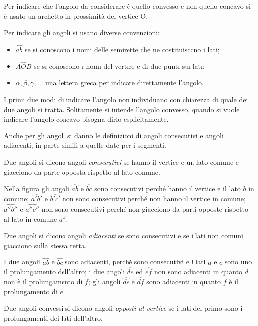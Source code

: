 {Per indicare che l'angolo da considerare è quello convesso e non quello concavo si è usato un archetto in prossimità del vertice O.

Per indicare gli angoli si usano diverse convenzioni:
\begin{itemize}
\item  $\widehat{ab}$ se si conoscono i nomi delle semirette che ne costituiscono i lati;
\item  $A\widehat {{O}}B$ se si conoscono i nomi del vertice e di due punti sui lati;
\item  $\alpha ,\beta ,\gamma ,\ldots $ una lettera greca per indicare direttamente l’angolo.
\end{itemize}
I primi due modi di indicare l'angolo non individuano con chiarezza di quale dei due angoli si tratta. Solitamente si intende l'angolo convesso, quando si vuole indicare l'angolo concavo bisogna dirlo esplicitamente.

Anche per gli angoli si danno le definizioni di angoli consecutivi e angoli adiacenti, in parte simili a quelle date per i segmenti.

\begin{definizione}
Due angoli si dicono angoli \emph{consecutivi} se hanno il vertice e un lato comune e giacciono da parte opposta rispetto al lato comune.
\end{definizione}

Nella figura gli angoli  $\widehat {ab}$ e $\widehat {bc}$  sono consecutivi perché hanno il vertice e il lato $ b $ in comune;  $\widehat {a'b'}$ e $\widehat {b'c'}$  non sono consecutivi perché non hanno il vertice in comune;  $\widehat {a''b''}$ e $\widehat {a''c''}$ non sono consecutivi perché non giacciono da parti opposte rispetto al lato in comune $ a'' $.

\begin{definizione}
Due angoli si dicono angoli \emph{adiacenti} se sono consecutivi e se i lati non comuni giacciono sulla stessa retta.
\end{definizione}

I due angoli  $\widehat {ab}$  e  $\widehat {bc}$  sono adiacenti, perché sono consecutivi e i lati $ a $ e $ c $ sono uno il prolungamento dell'altro; i due angoli  $\widehat {de}$  ed  $\widehat {ef}$  non sono adiacenti in quanto $ d $ non è il prolungamento di $ f $; gli angoli  $\widehat {de}$  e  $\widehat {df}$ sono adiacenti in quanto $ f $ è il prolungamento di $ e $.

\begin{definizione}
Due angoli convessi si dicono angoli \emph{opposti al vertice} se i lati del primo sono i prolungamenti dei lati dell'altro.
\end{definizione}

}
